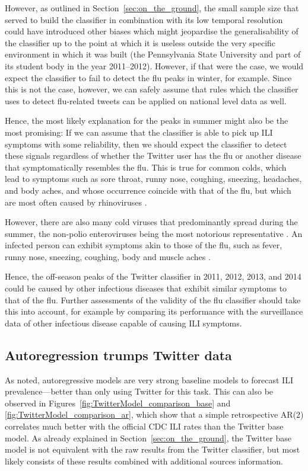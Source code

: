 \documentclass[11pt, a4paper,twoside]{report}\usepackage[]{graphicx}\usepackage[]{color}
\begin{document}
However, as outlined in Section~\ref{sec:on_the_ground}, the small sample size that served to build the classifier in combination with its low temporal resolution could have introduced other biases which might jeopardise the generalisability of the classifier up to the point at which it is useless outside the very specific environment in which it was built (the Pennsylvania State University and part of its student body in the year 2011--2012). However, if that were the case, we would expect the classifier to fail to detect the flu peaks in winter, for example. Since this is not the case, however, we can safely assume that rules which the classifier uses to detect flu-related tweets can be applied on national level data as well. 

Hence, the most likely explanation for the peaks in summer might also be the most promising: If we can assume that the classifier is able to pick up ILI symptoms with some reliability, then we should expect the classifier to detect these signals regardless of whether the Twitter user has the flu or another disease that symptomatically resembles the flu. This is true for common colds, which lead to symptoms such as sore throat, runny nose, coughing, sneezing, headaches, and body aches, and whose occurrence coincide with that of the flu, but which are most often caused by rhinoviruses \citep{heikkinen2003common,cdc_rhinovirus_2017}. 

However, there are also many cold viruses that predominantly spread during the summer, the non-polio enteroviruses being the most notorious representative  \citep{pons2015epidemiology}. An infected person can exhibit symptoms akin to those of the flu, such as fever, runny nose, sneezing, coughing, body and muscle aches \citep{pons2015epidemiology,cdc_enterovirus_2016}.

Hence, the off-season peaks of the Twitter classifier in 2011, 2012, 2013, and 2014 could be caused by other infectious diseases that exhibit similar symptoms to that of the flu. Further assessments of the validity of the flu classifier should take this into account, for example by comparing its performance with the surveillance data of other infectious disease capable of causing ILI symptoms.

\subsection{Autoregression trumps Twitter data}
As \cite{paul_twitter_2014} noted, autoregressive models are very strong baseline models to forecast ILI prevalence---better than only using Twitter for this task. This can also be observed in Figures~\ref{fig:TwitterModel_comparison_base} and \ref{fig:TwitterModel_comparison_ar}, which show that a simple retrospective AR(2) correlates much better with the official CDC ILI rates than the Twitter base model. As already explained in Section~\ref{sec:on_the_ground}, the Twitter base model is not equivalent with the raw results from the Twitter classifier, but most likely consists of these results combined with additional sources information. 
\end{document}

